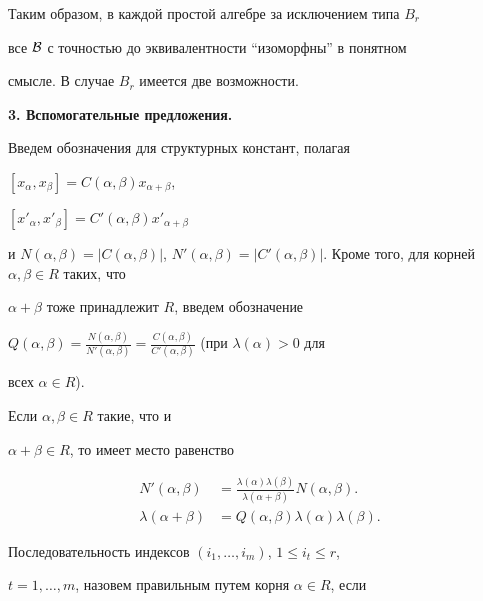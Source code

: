 Таким образом, в каждой простой алгебре за исключением типа $B_r$


все $\cal B$ с точностью до эквивалентности ``изоморфны'' в понятном


смысле. В случае $B_r$ имеется две возможности.


\medskip





{\bf 3. Вспомогательные предложения.}


Введем обозначения для структурных констант, полагая


$[x_\alpha,x_\beta]=C(\alpha,\beta)x_{\alpha+\beta}$,


$[x'_\alpha,x'_\beta]=C'(\alpha,\beta)x'_{\alpha+\beta}$


и $N(\alpha,\beta)=|C(\alpha,\beta)|$, $N'(\alpha,\beta)=


|C'(\alpha,\beta)|$. Кроме того, для корней $\alpha,\beta\in R$ таких, что


$\alpha+\beta$ тоже принадлежит $R$, введем обозначение


$Q(\alpha,\beta)=\frac{N(\alpha,\beta)}{N'(\alpha,\beta)}=


\frac{C(\alpha,\beta)}{C'(\alpha,\beta)}$ (при $\lambda(\alpha)>0$ для


всех $\alpha\in R$).





\begin{lem}


Если $\alpha,\beta\in R$ такие, что и


$\alpha+\beta\in R$, то имеет место равенство


\begin{align}


N'(\alpha,\beta)&=\frac{\lambda(\alpha)\lambda(\beta)}


{\lambda(\alpha+\beta)}N(\alpha,\beta).\\


%


\lambda(\alpha+\beta)&=Q(\alpha,\beta)\lambda(\alpha)\lambda(\beta).


\end{align}


\end{lem}





Последовательность индексов $(i_1,\dotsc,i_m)$, $1\le i_t\le r$,


$t=1,\dotsc,m$, назовем правильным путем корня $\alpha\in R$, если


